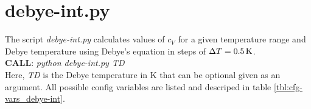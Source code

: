%
\section{debye-int.py}
The script \emph{debye-int.py} calculates values of $c_V$ for a given temperature range and Debye temperature using Debye's equation \cite{Debye1912} in steps of $\Delta T=\unit[0.5]{K}$.\\

\textbf{CALL}: \emph{python debye-int.py TD}\\

Here, \emph{TD} is the Debye temperature in K that can be optional given as an argument. All possible config variables are listed and descriped in table \ref{tbl:cfg-vars_debye-int}.
